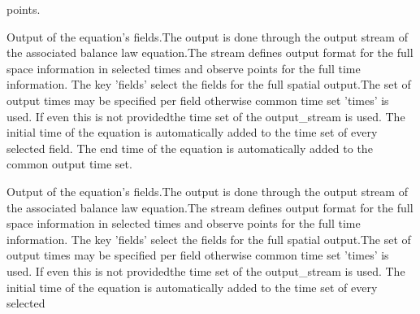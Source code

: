 \begin{RecordType}{}{}{}{}
{{{points.}}}\end{RecordType}\begin{RecordType}{}{}{}{}{{{Output of the equation's fields.The output is done through the output stream of the associated balance law equation.The stream defines output format for the full space information in selected times and observe points for the full time information. The key 'fields' select the fields for the full spatial output.The set of output times may be specified  per field otherwise common time set 'times' is used. If even this is not providedthe time set of the output{\_}stream is used. The initial time of the equation is automatically added to the time set of every selected field. The end time of the equation is automatically added to the common output time set.}}}\end{RecordType}\begin{RecordType}{}{}{}{}{{{Output of the equation's fields.The output is done through the output stream of the associated balance law equation.The stream defines output format for the full space information in selected times and observe points for the full time information. The key 'fields' select the fields for the full spatial output.The set of output times may be specified  per field otherwise common time set 'times' is used. If even this is not providedthe time set of the output{\_}stream is used. The initial time of the equation is automatically added to the time set of every selected }}}
\end{RecordType}
